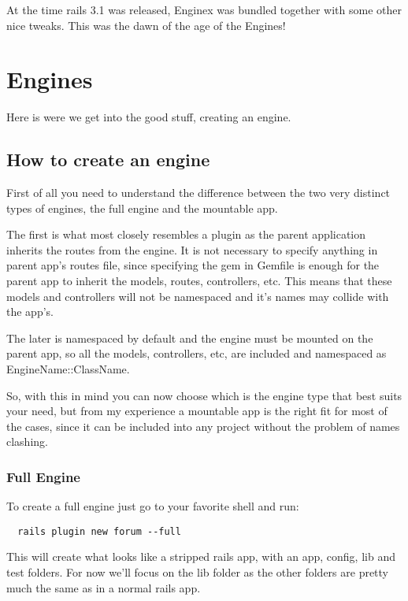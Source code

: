 \documentclass[12pt,a4paper,twoside]{book}
\begin{document}
At the time rails 3.1 was released, Enginex was bundled together with some other nice tweaks. This was the dawn of the age of the Engines!

\chapter{Engines}

Here is were we get into the good stuff, creating an engine.

\section{How to create an engine}

First of all you need to understand the difference between the two very distinct types of engines, the full engine and the mountable app. 

The first is what most closely resembles a plugin as the parent application inherits the routes from the engine. It is not necessary to specify anything in parent app's routes file, since specifying the gem in Gemfile is enough for the parent app to inherit the models, routes, controllers, etc. This means that these models and controllers will not be namespaced and it's names may collide with the app's.

The later is namespaced by default and the engine must be mounted on the parent app, so all the models, controllers, etc, are included and namespaced as EngineName::ClassName.

So, with this in mind you can now choose which is the engine type that best suits your need, but from my experience a mountable app is the right fit for most of the cases, since it can be included into any project without the problem of names clashing.

\subsection{Full Engine}

To create a full engine just go to your favorite shell and run:

\begin{verbatim}
  rails plugin new forum --full
\end{verbatim}

This will create what looks like a stripped rails app, with an app, config, lib and test folders. For now we'll focus on the lib folder as the other folders are pretty much the same as in a normal rails app.
\end{document}
